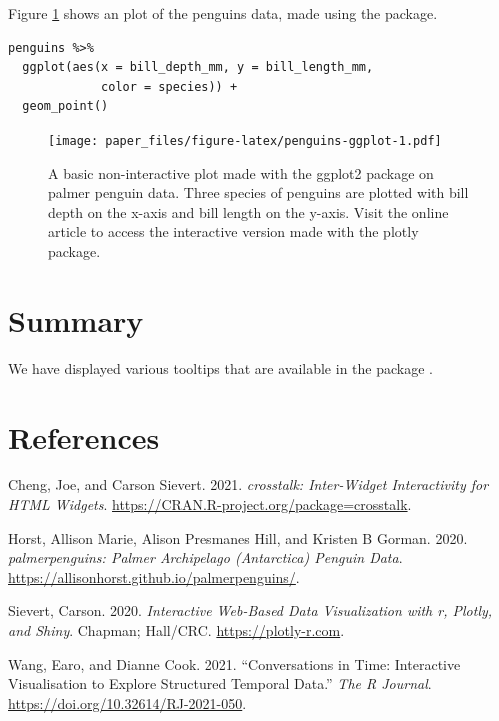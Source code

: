 Figure \ref{fig:penguins-ggplot} shows an plot of the penguins data, made using the  package.

\begin{verbatim}
penguins %>% 
  ggplot(aes(x = bill_depth_mm, y = bill_length_mm, 
             color = species)) + 
  geom_point()
\end{verbatim}

\begin{figure}
\centering
\texttt{[image: paper\_files/figure-latex/penguins-ggplot-1.pdf]}
\caption{\label{fig:penguins-ggplot}A basic non-interactive plot made with the ggplot2 package on palmer penguin data. Three species of penguins are plotted with bill depth on the x-axis and bill length on the y-axis. Visit the online article to access the interactive version made with the plotly package.}
\end{figure}

\hypertarget{summary}{%
\section{Summary}\label{summary}}

We have displayed various tooltips that are available in the package .

\hypertarget{references}{%
\section*{References}\label{references}}

\hypertarget{refs}{}
\begin{CSLReferences}{1}{0}
\leavevmode{}%
Cheng, Joe, and Carson Sievert. 2021. \emph{{crosstalk}: Inter-Widget Interactivity for HTML Widgets}. \url{https://CRAN.R-project.org/package=crosstalk}.

\leavevmode{}%
Horst, Allison Marie, Alison Presmanes Hill, and Kristen B Gorman. 2020. \emph{{palmerpenguins}: Palmer Archipelago (Antarctica) Penguin Data}. \url{https://allisonhorst.github.io/palmerpenguins/}.

\leavevmode{}%
Sievert, Carson. 2020. \emph{{Interactive Web-Based Data Visualizatio}n with r, Plotly, and Shiny}. Chapman; Hall/CRC. \url{https://plotly-r.com}.

\leavevmode{}%
Wang, Earo, and Dianne Cook. 2021. {``Conversations in Time: Interactive Visualisation to Explore Structured Temporal Data.''} \emph{The R Journal}. \url{https://doi.org/10.32614/RJ-2021-050}.

\end{CSLReferences}

